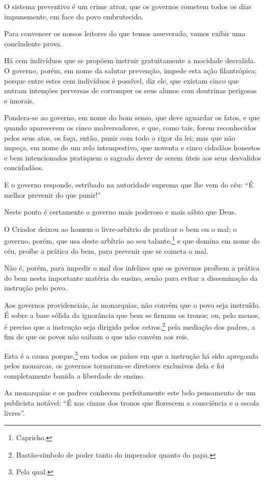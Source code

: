 O sistema preventivo é um crime atroz, que os governos cometem todos os
dias impunemente, em face do povo embrutecido.

Para convencer os nossos leitores do que temos asseverado, vamos exibir
uma concludente prova.

Há cem indivíduos que se propõem instruir gratuitamente a mocidade
desvalida. O governo, porém, em nome da salutar prevenção, impede esta
ação filantrópica; porque entre estes cem indivíduos é possível, diz
ele, que existam cinco que nutram intenções perversas de corromper os
seus alunos com doutrinas perigosas e imorais.

Pondera-se ao governo, em nome do bom senso, que deve aguardar os fatos,
e que quando aparecerem os cinco malversadores, e que, como tais, forem
reconhecidos pelos seus atos, os faça, então, punir com todo o rigor da
lei; mas que não impeça, em nome de um zelo intempestivo, que noventa e
cinco cidadãos honestos e bem intencionados pratiquem o sagrado dever de
serem úteis aos seus desvalidos concidadãos.

E o governo responde, estribado na autoridade suprema que lhe vem do
céu: ``É melhor prevenir do que punir!''

Neste ponto é certamente o governo mais poderoso e mais sábio que Deus.

O Criador deixou ao homem o livre-arbítrio de praticar o bem ou o mal; o
governo, porém, que usa deste arbítrio ao seu talante,\footnote{
  Capricho.} e que domina em nome do céu, proíbe a prática do bem, para
prevenir que se cometa o mal.

Não é, porém, para impedir o mal dos infelizes que os governos proíbem a
prática do bem nesta importante matéria do ensino, senão para evitar a
disseminação da instrução pelo povo.

Aos governos providenciais, às monarquias, não convém que o povo seja
instruído. É sobre a base sólida da ignorância que bem se firmam os
tronos; ou, pelo menos, é preciso que a instrução seja dirigida pelos
cetros,\footnote{Bastão-símbolo de poder tanto do imperador quanto do
  papa.} pela mediação dos padres, a fim de que os povos não saibam o
que não convém aos reis.

Esta é a causa porque,\footnote{Pela qual.} em todos os países em que
a instrução há sido apregoada pelos monarcas, os governos tornaram-se
diretores exclusivos dela e foi completamente banida a liberdade de
ensino.

As monarquias e os padres conhecem perfeitamente este belo pensamento de
um publicista notável: ``É nas cinzas dos tronos que florescem a
consciência e a escola livres''.

